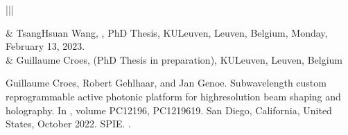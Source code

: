 \documentclass[a4paper,10pt,english,openany,oneside]{jupyterBook}
\begin{document}
\begin{savenotes}\sphinxattablestart
\centering
{}
\sphinxthecaptionisattop
{}\label{\detokenize{Publications:id1}}
\sphinxaftertopcaption
\begin{tabular}[t]{|||}
\hline

\sphinxAtStartPar
{}
&
\sphinxAtStartPar
Tsang\sphinxhyphen{}Hsuan Wang,
,
PhD Thesis, KULeuven, Leuven, Belgium, Monday, February 13, 2023.
\\
\hline
\sphinxAtStartPar
{}
&
\sphinxAtStartPar
Guillaume Croes, (PhD Thesis in preparation), KULeuven, Leuven, Belgium
\\
\hline
\end{tabular}
\par
\sphinxattableend\end{savenotes}

\sphinxstepscope

\begin{sphinxthebibliography}{1}
\sphinxAtStartPar
Guillaume Croes, Robert Gehlhaar, and Jan Genoe. Sub\sphinxhyphen{}wavelength custom reprogrammable active photonic platform for high\sphinxhyphen{}resolution beam shaping and holography. In , volume PC12196, PC1219619. San Diego, California, United States, October 2022. SPIE. .
\end{sphinxthebibliography}







\renewcommand{\indexname}{Index}
\printindex
\end{document}
